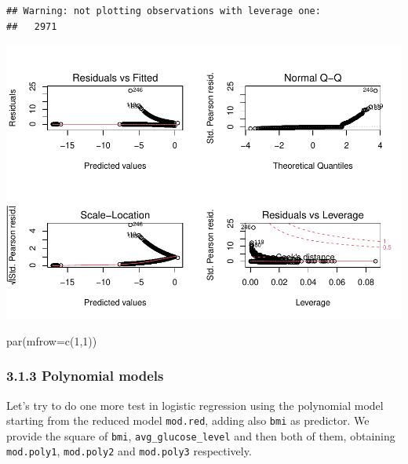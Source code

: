 \documentclass[
]{article}
\newenvironment{Shaded}{\begin{snugshade}}{\end{snugshade}}
\newcommand{\AttributeTok}[1]{\textcolor[rgb]{0.77,0.63,0.00}{#1}}
\newcommand{\DecValTok}[1]{\textcolor[rgb]{0.00,0.00,0.81}{#1}}
\newcommand{\FunctionTok}[1]{\textcolor[rgb]{0.00,0.00,0.00}{#1}}
\newcommand{\NormalTok}[1]{#1}
\begin{document}
\begin{verbatim}
## Warning: not plotting observations with leverage one:
##   2971
\end{verbatim}

\includegraphics{stat-project-stroke_files/figure-latex/unnamed-chunk-27-1.pdf}

\begin{Shaded}
\begin{Highlighting}[]
\FunctionTok{par}\NormalTok{(}\AttributeTok{mfrow=}\FunctionTok{c}\NormalTok{(}\DecValTok{1}\NormalTok{,}\DecValTok{1}\NormalTok{))}
\end{Highlighting}
\end{Shaded}

\hypertarget{polynomial-models}{%
\subsubsection{3.1.3 Polynomial models}\label{polynomial-models}}

Let's try to do one more test in logistic regression using the
polynomial model starting from the reduced model \texttt{mod.red},
adding also \texttt{bmi} as predictor. We provide the square of
\texttt{bmi}, \texttt{avg\_glucose\_level} and then both of them,
obtaining \texttt{mod.poly1}, \texttt{mod.poly2} and \texttt{mod.poly3}
respectively.
\end{document}
